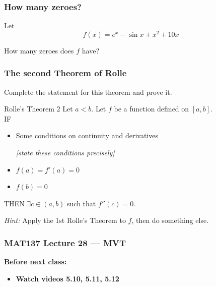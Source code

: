 \documentclass[14pt]{beamer}
\begin{document}

	\begin{frame}[t]
		\frametitle{How many zeroes?}

		Let
		\[
			f(x) = e^{x}- \sin x + x^{2}+ 10x
		\]

		How many zeroes does $f$ have?
	\end{frame}

	\begin{frame}[t]
		\frametitle{The second Theorem of Rolle}

		Complete the statement for this theorem and prove it.

		\vfill

		\begin{block}{Rolle's Theorem 2}
			Let $a<b$. Let $f$ be a function defined on $[a,b]$. \\ IF
			\begin{itemize}
				\item Some conditions on continuity and derivatives

					\emph{[state these conditions precisely]}

				\item $\displaystyle f(a) = f'(a) =0$

				\item $\displaystyle f(b)=0$
			\end{itemize}
			THEN $\displaystyle \exists c \in (a,b)$ such that $\displaystyle f''(c)=0$.
		\end{block}

		\vfill

		\emph{Hint:} Apply the 1st Rolle's Theorem to $f$, then do something else.
	\end{frame}















\begin{frame}
	\frametitle{MAT137 Lecture 28 --- MVT}

	\vfill
	{\bf Before next class:}
		\begin{itemize} \normalsize
			\item {\bf Watch videos  5.10, 5.11, 5.12}
		\end{itemize}
\end{frame}
\end{document}
